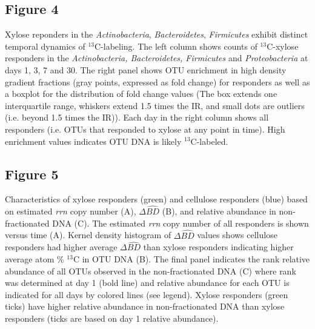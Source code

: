 \subsection{Figure 4}
Xylose reponders in the \textit{Actinobacteria}, \textit{Bacteroidetes},
\textit{Firmicutes} exhibit distinct temporal dynamics of $^{13}$C-labeling.
The left column shows counts of $^{13}$C-xylose responders in the
\textit{Actinobacteria, Bacteroidetes, Firmicutes} and \textit{Proteobacteria}
at days 1, 3, 7 and 30. The right panel shows OTU enrichment in high density
gradient fractions (gray points, expressed as fold change) for responders
as well as a boxplot for the distribution of fold change values
(The box extends one interquartile range, whiskers extend 1.5 times
the IR, and small dots are outliers (i.e. beyond 1.5 times the IR)).
Each day in the right column shows all responders (i.e.
OTUs that responded to xylose at any point in time). High enrichment values 
indicates OTU DNA is likely $^{13}$C-labeled.
    
\subsection{Figure 5}
Characteristics of xylose responders (green) and cellulose responders (blue)
based on estimated \textit{rrn} copy number (A), $\Delta\hat{BD}$ (B), and
relative abundance in non-fractionated DNA (C). The estimated \textit{rrn} copy
number of all responders is shown versus time (A). Kernel density histogram of
$\Delta\hat{BD}$ values shows cellulose responders had higher average
$\Delta\hat{BD}$ than xylose responders indicating higher average atom \%
$^{13}$C in OTU DNA (B). The final panel indicates the rank relative abundance
of all OTUs observed in the non-fractionated DNA (C) where rank was determined
at day 1 (bold line) and relative abundance for each OTU is indicated for all
days by colored lines (see legend). Xylose responders (green ticks) have higher
relative abundance in non-fractionated DNA than xylose responders (ticks are
based on day 1 relative abundance).
